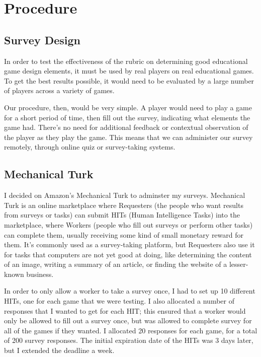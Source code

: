 \chapter{Procedure}

	\section{Survey Design}
		In order to test the effectiveness of the rubric on determining good educational game design elements, it must be used by real players on real educational games. To get the best results possible, it would need to be evaluated by a large number of players across a variety of games.

		Our procedure, then, would be very simple. A player would need to play a game for a short period of time, then fill out the survey, indicating what elements the game had. There's no need for additional feedback or contextual observation of the player as they play the game. This means that we can administer our survey remotely, through online quiz or survey-taking systems.

	\section{Mechanical Turk}
		I decided on Amazon's Mechanical Turk to adminster my surveys. Mechanical Turk is an online marketplace where Requesters (the people who want results from surveys or tasks) can submit HITs (Human Intelligence Tasks) into the marketplace, where Workers (people who fill out surveys or perform other tasks) can complete them, usually receiving some kind of small monetary reward for them. It's commonly used as a survey-taking platform, but Requesters also use it for tasks that computers are not yet good at doing, like determining the content of an image, writing a summary of an article, or finding the website of a lesser-known business.


		In order to only allow a worker to take a survey once, I had to set up 10 different HITs, one for each game that we were testing. I also allocated a number of responses that I wanted to get for each HIT; this ensured that a worker would only be allowed to fill out a survey once, but was allowed to complete survey for all of the games if they wanted. I allocated 20 responses for each game, for a total of 200 survey responses. The initial expiration date of the HITs was 3 days later, but I extended the deadline a week. 

